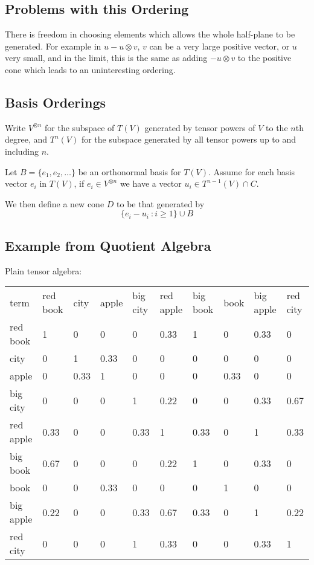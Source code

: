 \documentclass{article}
\begin{document}
\subsection{Problems with this Ordering}

There is freedom in choosing elements which allows the whole
half-plane to be generated. For example in $u - u\otimes v$, $v$ can
be a very large positive vector, or $u$ very small, and in the limit,
this is the same as adding $-u\otimes v$ to the positive cone which
leads to an uninteresting ordering.


\subsection{Basis Orderings}

Write $V^{\otimes n}$ for the subspace of $T(V)$ generated by tensor
powers of $V$ to the $n$th degree, and $T^n(V)$ for the subspace
generated by all tensor powers up to and including $n$.

Let $B = \{e_1, e_2, \ldots\}$ be an orthonormal basis for
$T(V)$. Assume for each basis vector $e_i$ in $T(V)$, if $e_i\in
V^{\otimes n}$ we have a vector $u_i \in T^{n-1}(V) \cap C$.

We then define a new cone $D$ to be that generated by
$$\{e_i - u_i\ : i \ge 1\} \cup B$$

\subsection{Example from Quotient Algebra}

Plain tensor algebra:

\begin{tabular}{llllllllll}
term & red book &  city &  apple & big city & red apple & big book &  book & big apple & red city\\ 
red book & 1 & 0 & 0 & 0 & 0.33 & 1 & 0 & 0.33 & 0\\ 
 city & 0 & 1 & 0.33 & 0 & 0 & 0 & 0 & 0 & 0\\ 
 apple & 0 & 0.33 & 1 & 0 & 0 & 0 & 0.33 & 0 & 0\\ 
big city & 0 & 0 & 0 & 1 & 0.22 & 0 & 0 & 0.33 & 0.67\\ 
red apple & 0.33 & 0 & 0 & 0.33 & 1 & 0.33 & 0 & 1 & 0.33\\ 
big book & 0.67 & 0 & 0 & 0 & 0.22 & 1 & 0 & 0.33 & 0\\ 
 book & 0 & 0 & 0.33 & 0 & 0 & 0 & 1 & 0 & 0\\ 
big apple & 0.22 & 0 & 0 & 0.33 & 0.67 & 0.33 & 0 & 1 & 0.22\\ 
red city & 0 & 0 & 0 & 1 & 0.33 & 0 & 0 & 0.33 & 1\\ 
\end{tabular}
\end{document}
